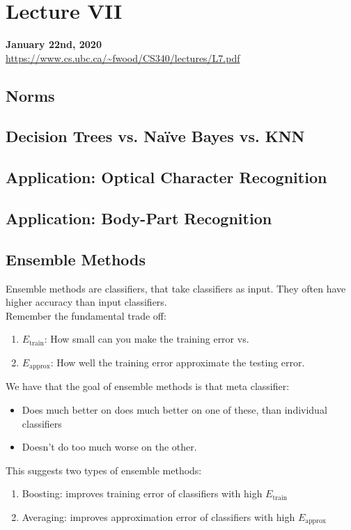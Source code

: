 \documentclass{article}
\def\blu#1{{\color{blu}#1}}
\theoremstyle{definition}
\begin{document}
\newpage
\section*{Lecture VII}
\textbf{January 22nd, 2020}\\
\url{https://www.cs.ubc.ca/~fwood/CS340/lectures/L7.pdf}
\subsection*{Norms}
\subsection*{Decision Trees vs. Naïve Bayes vs. KNN}
\subsection*{Application: Optical Character Recognition}
\subsection*{Application: Body-Part Recognition}
\subsection*{Ensemble Methods}
Ensemble methods are \blu{classifiers, that take classifiers as input}. They often have higher accuracy than input classifiers. \\
Remember the fundamental trade off:
\begin{enumerate}
	\item $ E_{\text{train}} $: How small can you make the training error \blu{vs.}
	\item $ E_{\text{approx}} $: How well the training error approximate the testing error.
\end{enumerate}
We have that the goal of ensemble methods is that meta classifier:
\begin{itemize}
	\item Does much better on does much better on one of these, than individual classifiers
	\item Doesn’t do too much worse on the other.
\end{itemize}
This suggests two types of ensemble methods:
\begin{enumerate}
	\item \blu{Boosting:} improves training error of classifiers with high $ E_{\text{train}} $
	\item \blu{Averaging:} improves approximation error of classifiers with high $ E_{\text{approx}} $
\end{enumerate}
\end{document}
